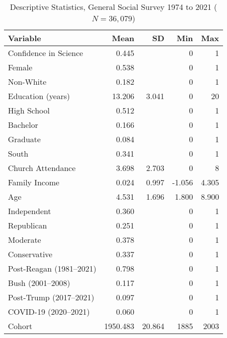 \begin{table}[ht]
\centering
\caption{Descriptive Statistics, General Social Survey 1974 to 2021 ($N=36,079$)} 
\begin{tabularx}{\textwidth}{Xrrrr}
  \toprule
Variable & Mean & SD & Min & Max \\ 
  \midrule
Confidence in Science & 0.445 &  & 0 & 1 \\ 
  Female & 0.538 &  & 0 & 1 \\ 
  Non-White & 0.182 &  & 0 & 1 \\ 
  Education (years) & 13.206 & 3.041 & 0 & 20 \\ 
  High School & 0.512 &  & 0 & 1 \\ 
  Bachelor & 0.166 &  & 0 & 1 \\ 
  Graduate & 0.084 &  & 0 & 1 \\ 
  South & 0.341 &  & 0 & 1 \\ 
  Church Attendance & 3.698 & 2.703 & 0 & 8 \\ 
  Family Income & 0.024 & 0.997 & -1.056 & 4.305 \\ 
  Age & 4.531 & 1.696 & 1.800 & 8.900 \\ 
  Independent & 0.360 &  & 0 & 1 \\ 
  Republican & 0.251 &  & 0 & 1 \\ 
  Moderate & 0.378 &  & 0 & 1 \\ 
  Conservative & 0.337 &  & 0 & 1 \\ 
  Post-Reagan (1981--2021) & 0.798 &  & 0 & 1 \\ 
  Bush (2001--2008) & 0.117 &  & 0 & 1 \\ 
  Post-Trump (2017--2021) & 0.097 &  & 0 & 1 \\ 
  COVID-19 (2020--2021) & 0.060 &  & 0 & 1 \\ 
  Cohort & 1950.483 & 20.864 & 1885 & 2003 \\ 
   \bottomrule
\end{tabularx}
\end{table}
